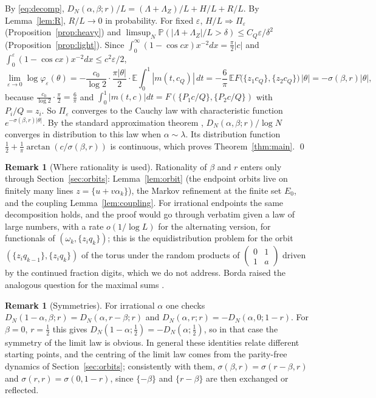 \documentclass[11pt]{amsart}
\theoremstyle{definition}
\newtheorem{remark}[theorem]{Remark}
\numberwithin{equation}{section}
\newcommand{\E}{\mathbb{E}}
\newcommand{\Prob}{\mathbb{P}}
\newcommand{\fr}[1]{\{#1\}}
\newcommand{\eps}{\varepsilon}
\begin{document}
By \eqref{eq:decomp}, $D_N(\alpha,\beta;r)/L=(\Lambda+\Lambda_Z)/L+H/L+R/L$. By Lemma~\ref{lem:R}, $R/L\to0$ in probability. For fixed $\eps$,
$H/L\Rightarrow\Pi_\eps$ (Proposition~\ref{prop:heavy}) and $\limsup_N\Prob(|\Lambda+\Lambda_Z|/L>\delta)\le C_Q\eps/\delta^2$ (Proposition~\ref{prop:light}).
Since $\int_0^\infty(1-\cos cx)x^{-2}dx=\frac\pi2|c|$ and $\int_0^\eps(1-\cos cx)x^{-2}dx\le c^2\eps/2$,
\[
\lim_{\eps\to0}\log\varphi_\eps(\theta)=-\frac{c_0}{\log2}\cdot\frac{\pi|\theta|}{2}\cdot\E\int_0^1|m(t,c_Q)|\,dt=-\frac6\pi\,\E F\big(\fr{z_1c_Q},\fr{z_2c_Q}\big)\,|\theta|=-\sigma(\beta,r)|\theta| ,
\]
because $\frac{c_0}{\log2}\cdot\frac\pi2=\frac6\pi$ and $\int_0^1|m(t,c)|dt=F(\fr{P_1c/Q},\fr{P_2c/Q})$ with $P_i/Q=z_i$. So $\Pi_\eps$ converges to the Cauchy law with
characteristic function $e^{-\sigma(\beta,r)|\theta|}$. By the standard approximation theorem \cite[Theorem~3.2]{Bi99}, $D_N(\alpha,\beta;r)/\log N$ converges in
distribution to this law when $\alpha\sim\lambda$. Its distribution function $\frac12+\frac1\pi\arctan(c/\sigma(\beta,r))$ is continuous, which proves
Theorem~\ref{thm:main}. \qed

\begin{remark}[Where rationality is used]\label{rem:where}
Rationality of $\beta$ and $r$ enters only through Section~\ref{sec:orbits}: Lemma~\ref{lem:orbit} (the endpoint orbits live on finitely many lines
$z=\fr{u+v\alpha_k}$), the Markov refinement at the finite set $E_0$, and the coupling Lemma~\ref{lem:coupling}. For irrational endpoints the same
decomposition holds, and the proof would go through verbatim given a law of large numbers, with a rate $o(1/\log L)$ for the alternating version, for
functionals of $(\omega_k,\fr{z_iq_k})$; this is the equidistribution problem for the orbit $(\fr{z_iq_{k-1}},\fr{z_iq_k})$ of the torus under the random
products of $\left(\begin{smallmatrix}0&1\\1&a\end{smallmatrix}\right)$ driven by the continued fraction digits, which we do not address. Borda raised the
analogous question for the maximal sums \cite{Bo25}.
\end{remark}

\begin{remark}[Symmetries]
For irrational $\alpha$ one checks $D_N(1-\alpha,\beta;r)=D_N(\alpha,r-\beta;r)$ and $D_N(\alpha,r;r)=-D_N(\alpha,0;1-r)$. For $\beta=0$, $r=\frac12$ this gives
$D_N(1-\alpha;\frac12)=-D_N(\alpha;\frac12)$, so in that case the symmetry of the limit law is obvious. In general these identities relate different
starting points, and the centring of the limit law comes from the parity-free dynamics of Section~\ref{sec:orbits}; consistently with them,
$\sigma(\beta,r)=\sigma(r-\beta,r)$ and $\sigma(r,r)=\sigma(0,1-r)$, since $\fr{-\beta}$ and $\fr{r-\beta}$ are then exchanged or reflected.
\end{remark}
\end{document}
